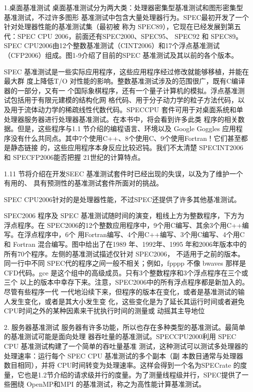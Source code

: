 1.桌面基准测试
桌面基准测试分为两大类：处理器密集型基准测试和图形密集型基准测试，不过许多图形
基准测试中包含大量处理器行为。SPEC最初开发了一个针对处理器性能的基准测试集（最初被
称为 SPEC89），它现在已经发展到第五代：SPEC CPU 2006，前面还有SPEC2000、SPEC95、
SPEC92 和 SPEC89。SPEC CPU2006由12个整数基准测试（CINT2006）和17个浮点基准测试
（CFP2006）组成。图1-9介绍了目前的SPEC 基准测试及其以前的各个版本。

SPEC 基准测试是一些实际应用程序，这些应用程序经过修改就能够移植，并能在最大群
度上降低T/O 对性能的影响。整数基准测试涉及的范围很广，既有C编译器的一部分，又有一
个国际象棋程序，还有一个量子计算机的模拟。浮点基准测试包括用于有限元建模的结构化网
格代码、用于分子动力学的粒子方法代码，以及用于流体动力学的稀疏线性代数代码。SPECCPU
套件可用于对桌面系统和单处理器服务器进行处理器基准测试。在本书中，将会看到许多此类
程序的相关数据。但是，这些程序与1.1 节介绍的编程语言、环境以及 Google Goggles 应用程
序没有什么共同点。其中7个使用C++、8个使用C、9个使用Fortran！它们甚至都是静态链接
的，这些应用程序本身反应比较迟钝。我们不太清楚 SPECINT2006 和 SPECFP2006能否把握
21世纪的计算特点。

1.11 节将介绍在开发SEEC 基准测试套件时已经出现的失误，以及为了维护一个有用的、
具有预测性的基准测试套件所面对的挑战。

SPEC CPU2006针对的是处理器性能，不过SPEC还提供了许多其他基准测试。

SPEC2006 程序及 SPEC 基准测试随时间的演变，粗线上方为整数程序，下方为浮点程序。在
SPEC2006的12个整数应用程序中，9个用C编写、其余3个用C++编写。在浮点程序中，6个
用Fortran编写、4个用C++编写、3个用C编写、4个用C和 Fortran 混合编写。图中给出了在1989
年、1992年、1995 年和2006年版本中的所有70个程序。左侧的基准测试描述仅针对 SPEC2006，
不适用于之前的版本。同一行中不同 SPEC代的程序之间一般不相关；例如，fpppp 不像 bwaves
那样是 CFD代码。gce 是这个组中的高级成员。只有3个整数程序和3个浮点程序在三个或三个
以上的版本中幸存下来。注意，SPEC2006中的所有浮点程序都是新加入的。尽管有些程序一代
一代地沿续下来，但程序的版本在变化，或者是基准测试的输人发生变化，或者是其大小发生变
化，这些变化是为了延长其运行时间或者避免CPU时间之外的某种因素来干扰执行时间的测量或
动摇其主导地位

2. 服务器基准测试
服务器有许多功能，所以也存在多种类型的基准测试。最简单的基准测试可能是面向处理
器吞吐量的基准测试。SPECCPU2000利用 SPEC CPU 基准测试构建了一个简单的吞吐量基准
测试，这种测试可以测试多处理器的处理速率：运行每个 SPEC CPU 基准测试的多个副本（副
本数目通常与处理器数目相同），并将 CPU时间转变为处理速率。这样会得到一个名为SPECrate
的度量，它也是1.2节介绍的请求级并行的度量。为了测量线程级并行，SPEC提供了一些圈绕
OpenMP和MPI 的基准测试，称之为高性能计算基准测试。

